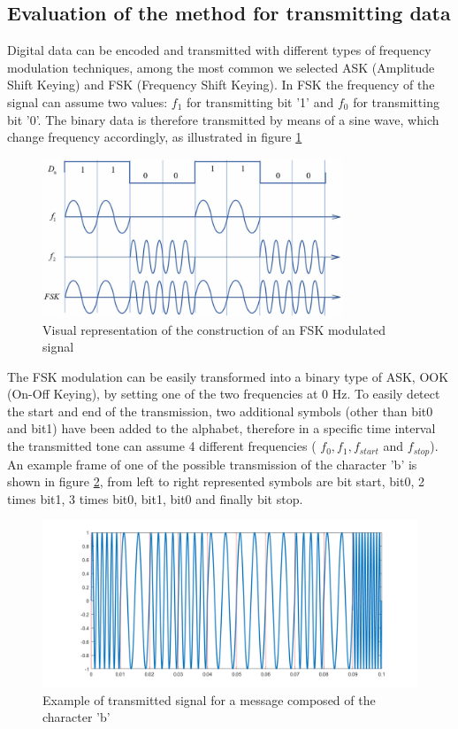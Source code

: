 \subsection{Evaluation of the method for transmitting data}
Digital data can be encoded and transmitted with different types of frequency modulation techniques, among the most common we selected ASK (Amplitude Shift Keying) and FSK (Frequency Shift Keying).
In FSK the frequency of the signal can assume two values: $f_{1}$ for transmitting bit '1' and $f_{0}$ for transmitting bit '0'. The binary data is therefore transmitted by means of a sine wave, which change frequency accordingly, as illustrated in figure \ref{fig:FSKbuild} 
\begin{figure}[h]
    \centering
    \includegraphics[width=0.8\textwidth]{LiveAudioWatermarking/images/FSK-modulation-wave-forms-example.png}
    \caption{Visual representation of the construction of an FSK modulated signal}
    \label{fig:FSKbuild}
\end{figure}

The FSK modulation can be easily transformed into a binary type of ASK, OOK (On-Off Keying), by setting one of the two frequencies at 0 Hz.
To easily detect the start and end of the transmission, two additional symbols (other than bit0 and bit1) have been added to the alphabet, therefore in a specific time interval the transmitted tone can assume 4 different frequencies ( $f_0, f_1, f_{start}$ and $ f_{stop}$). An example frame of one of the possible transmission of the character 'b' is shown in figure \ref{fig:FSK example}, from left to right represented symbols are bit start, bit0, 2 times bit1, 3 times bit0, bit1, bit0 and finally bit stop.

\begin{figure}
    \centering
    \includegraphics[width=\linewidth]{LiveAudioWatermarking/images/FSKex.png}
    \caption{Example of transmitted signal for a message composed of the character 'b'}
    \label{fig:FSK example}
\end{figure}

